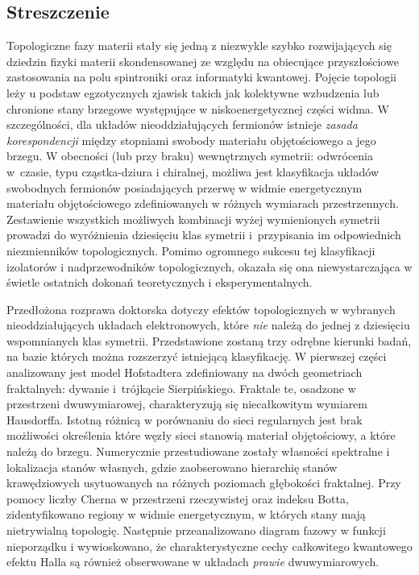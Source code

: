 \cleardoublepage%

\begingroup
\let\clearpage\relax
\let\cleardoublepage\relax
\let\cleardoublepage\relax

\begin{otherlanguage}{polish}
\chapter*{Streszczenie}
Topologiczne fazy materii stały się jedną z niezwykle szybko rozwijających się dziedzin fizyki materii skondensowanej ze względu na obiecujące przyszłościowe zastosowania na polu spintroniki oraz informatyki kwantowej. Pojęcie topologii leży u podstaw egzotycznych zjawisk takich jak kolektywne wzbudzenia lub chronione stany brzegowe występujące w niskoenergetycznej części widma. W szczególności, dla układów nieoddziałujących fermionów istnieje \emph{zasada korespondencji} między stopniami swobody materiału objętościowego a jego brzegu. W obecności (lub przy braku) wewnętrznych symetrii: odwrócenia w~czasie, typu cząstka-dziura i chiralnej, możliwa jest klasyfikacja układów swobodnych fermionów posiadających przerwę w widmie energetycznym materiału objętościowego zdefiniowanych w różnych wymiarach przestrzennych. Zestawienie wszystkich możliwych kombinacji wyżej wymienionych symetrii prowadzi do wyróżnienia dziesięciu klas symetrii i~przypisania im odpowiednich niezmienników topologicznych. Pomimo ogromnego sukcesu tej klasyfikacji izolatorów i nadprzewodników topologicznych, okazała się ona niewystarczająca w świetle ostatnich dokonań teoretycznych i eksperymentalnych.

Przedłożona rozprawa doktorska dotyczy efektów topologicznych w wybranych nieoddziałujących układach elektronowych, które \emph{nie} należą do jednej z dziesięciu wspomnianych klas symetrii. Przedstawione zostaną trzy odrębne kierunki badań, na bazie których można rozszerzyć istniejącą klasyfikację. W pierwszej części analizowany jest model Hofstadtera zdefiniowany na dwóch geometriach fraktalnych: dywanie i~trójkącie Sierpińskiego. Fraktale te, osadzone w przestrzeni dwuwymiarowej, charakteryzują się niecałkowitym wymiarem Hausdorffa. Istotną różnicą w porównaniu do sieci regularnych jest brak możliwości określenia które węzły sieci stanowią materiał objętościowy, a które należą do brzegu. Numerycznie przestudiowane zostały własności spektralne i lokalizacja stanów własnych, gdzie zaobserowano hierarchię stanów krawędziowych usytuowanych na różnych poziomach głębokości fraktalnej. Przy pomocy liczby Cherna w przestrzeni rzeczywistej oraz indeksu Botta, zidentyfikowano regiony w widmie energetycznym, w których stany mają nietrywialną topologię. Następnie przeanalizowano diagram fazowy w funkcji nieporządku i wywioskowano, że charakterystyczne cechy całkowitego kwantowego efektu Halla są również obserwowane w układach \emph{prawie} dwuwymiarowych.


\end{otherlanguage}
